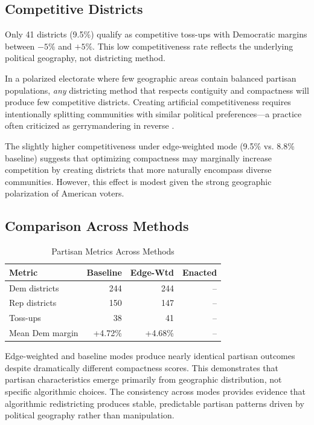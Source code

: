 \subsection{Competitive Districts}

Only 41 districts (9.5\%) qualify as competitive toss-ups with Democratic margins between $-5\%$ and $+5\%$. This low competitiveness rate reflects the underlying political geography, not districting method.

In a polarized electorate where few geographic areas contain balanced partisan populations, \textit{any} districting method that respects contiguity and compactness will produce few competitive districts. Creating artificial competitiveness requires intentionally splitting communities with similar political preferences—a practice often criticized as gerrymandering in reverse \cite{polsby1991third}.

The slightly higher competitiveness under edge-weighted mode (9.5\% vs. 8.8\% baseline) suggests that optimizing compactness may marginally increase competition by creating districts that more naturally encompass diverse communities. However, this effect is modest given the strong geographic polarization of American voters.

\subsection{Comparison Across Methods}

\begin{table}[h]
\centering
\caption{Partisan Metrics Across Methods}
\begin{tabular}{lrrr}
\toprule
\textbf{Metric} & \textbf{Baseline} & \textbf{Edge-Wtd} & \textbf{Enacted} \\
\midrule
Dem districts & 244 & 244 & -- \\
Rep districts & 150 & 147 & -- \\
Toss-ups & 38 & 41 & -- \\
Mean Dem margin & +4.72\% & +4.68\% & -- \\
\bottomrule
\end{tabular}
\end{table}

Edge-weighted and baseline modes produce nearly identical partisan outcomes despite dramatically different compactness scores. This demonstrates that partisan characteristics emerge primarily from geographic distribution, not specific algorithmic choices. The consistency across modes provides evidence that algorithmic redistricting produces stable, predictable partisan patterns driven by political geography rather than manipulation.

